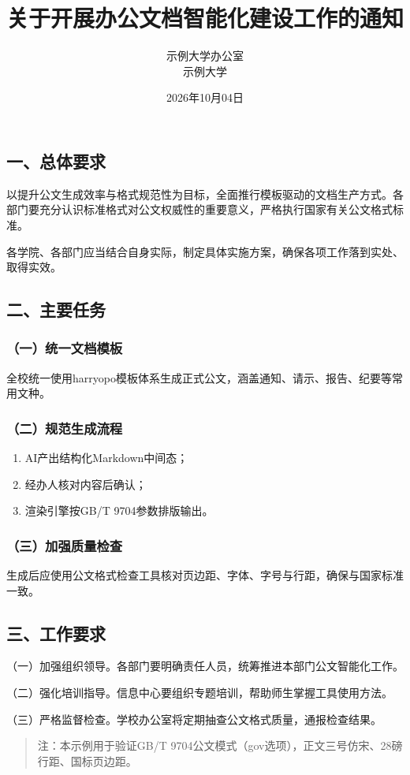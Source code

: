\documentclass[gov]{harryopo-paper}
\title{关于开展办公文档智能化建设工作的通知}
\author{示例大学办公室\\ \fzfs\small 示例大学}
\date{2026年10月04日}
\begin{document}
\maketitle

\subsection*{一、总体要求}

以提升公文生成效率与格式规范性为目标，全面推行模板驱动的文档生产方式。各部门要充分认识标准格式对公文权威性的重要意义，严格执行国家有关公文格式标准。

各学院、各部门应当结合自身实际，制定具体实施方案，确保各项工作落到实处、取得实效。

\subsection*{二、主要任务}

\subsubsection*{（一）统一文档模板}

全校统一使用harryopo模板体系生成正式公文，涵盖通知、请示、报告、纪要等常用文种。

\subsubsection*{（二）规范生成流程}

\begin{enumerate}
  \item AI产出结构化Markdown中间态；
  \item 经办人核对内容后确认；
  \item 渲染引擎按GB/T 9704参数排版输出。
\end{enumerate}

\subsubsection*{（三）加强质量检查}

生成后应使用公文格式检查工具核对页边距、字体、字号与行距，确保与国家标准一致。

\subsection*{三、工作要求}

（一）加强组织领导。各部门要明确责任人员，统筹推进本部门公文智能化工作。

（二）强化培训指导。信息中心要组织专题培训，帮助师生掌握工具使用方法。

（三）严格监督检查。学校办公室将定期抽查公文格式质量，通报检查结果。

\begin{quote}
注：本示例用于验证GB/T 9704公文模式（gov选项），正文三号仿宋、28磅行距、国标页边距。
\end{quote}
\end{document}
